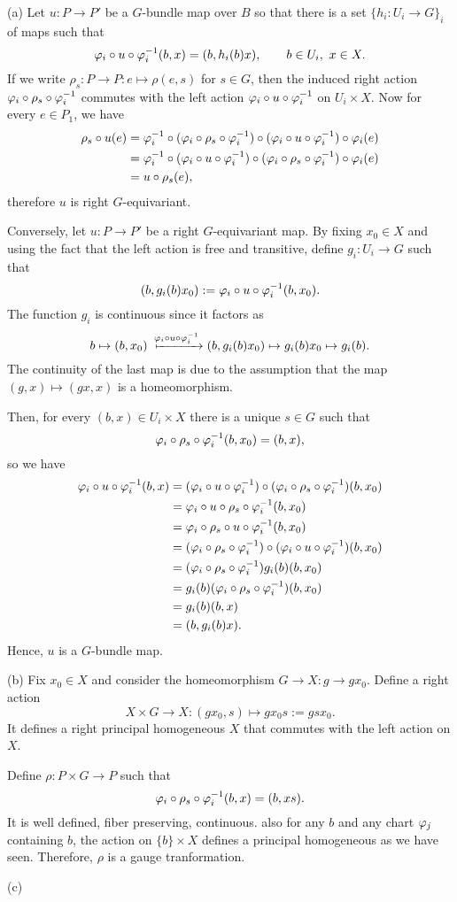 \documentclass{../../large}
\begin{document}
\begin{pf}
(a)
Let $u:P\to P'$ be a $G$-bundle map over $B$ so that there is a set $\{h_i:U_i\to G\}_i$ of maps such that
\[\varphi_i\circ u\circ\varphi_i^{-1}(b,x)=(b,h_i(b)x),
\qquad b\in U_i,\ x\in X.\]
If we write $\rho_s:P\to P:e\mapsto \rho(e,s)$ for $s\in G$, then the induced right action $\varphi_i\circ\rho_s\circ\varphi_i^{-1}$ commutes with the left action $\varphi_i\circ u\circ\varphi_i^{-1}$ on $U_i\times X$.
Now for every $e\in P_1$, we have
\begin{align*}
\rho_s\circ u(e)
&=\varphi_i^{-1}\circ(\varphi_i\circ\rho_s\circ\varphi_i^{-1})\circ(\varphi_i\circ u\circ\varphi_i^{-1})\circ\varphi_i(e)\\
&=\varphi_i^{-1}\circ(\varphi_i\circ u\circ\varphi_i^{-1})\circ(\varphi_i\circ\rho_s\circ\varphi_i^{-1})\circ\varphi_i(e)\\
&=u\circ\rho_s(e),
\end{align*}
therefore $u$ is right $G$-equivariant.

Conversely, let $u:P\to P'$ be a right $G$-equivariant map.
By fixing $x_0\in X$ and using the fact that the left action is free and transitive, define $g_i:U_i\to G$ such that
\[(b,g_i(b)x_0):=\varphi_i\circ u\circ\varphi_i^{-1}(b,x_0).\]
The function $g_i$ is continuous since it factors as
\[b\mapsto(b,x_0)\xmapsto{\f_i\circ u\circ\f_i^{-1}}(b,g_i(b)x_0)\mapsto g_i(b)x_0\mapsto g_i(b).\]
The continuity of the last map is due to the assumption that the map $(g,x)\mapsto(gx,x)$ is a homeomorphism.

Then, for every $(b,x)\in U_i\times X$ there is a unique $s\in G$ such that
\[\varphi_i\circ\rho_s\circ\varphi_i^{-1}(b,x_0)=(b,x),\]
so we have
\begin{align*}
\varphi_i\circ u\circ\varphi_i^{-1}(b,x)
&=(\varphi_i\circ u\circ\varphi_i^{-1})\circ(\varphi_i\circ\rho_s\circ\varphi_i^{-1})(b,x_0)\\
&=\varphi_i\circ u\circ\rho_s\circ\varphi_i^{-1}(b,x_0)\\
&=\varphi_i\circ\rho_s\circ u\circ\varphi_i^{-1}(b,x_0)\\
&=(\varphi_i\circ\rho_s\circ\varphi_i^{-1})\circ(\varphi_i\circ u\circ\varphi_i^{-1})(b,x_0)\\
&=(\varphi_i\circ\rho_s\circ\varphi_i^{-1})g_i(b)(b,x_0)\\
&=g_i(b)(\varphi_i\circ\rho_s\circ\varphi_i^{-1})(b,x_0)\\
&=g_i(b)(b,x)\\
&=(b,g_i(b)x).
\end{align*}
Hence, $u$ is a $G$-bundle map.

(b)
Fix $x_0\in X$ and consider the homeomorphism $G\to X:g\to gx_0$.
Define a right action
\[X\times G\to X:(gx_0,s)\mapsto gx_0s:=gsx_0.\]
It defines a right principal homogeneous $X$ that commutes with the left action on $X$.

Define $\rho:P\times G\to P$ such that
\[\varphi_i\circ\rho_s\circ\varphi_i^{-1}(b,x)=(b,xs).\]
It is well defined, fiber preserving, continuous.
also for any $b$ and any chart $\varphi_j$ containing $b$, the action on $\{b\}\times X$ defines a principal homogeneous as we have seen.
Therefore, $\rho$ is a gauge tranformation.

(c)

\end{pf}
\end{document}
